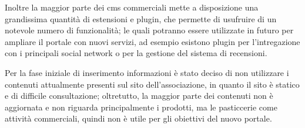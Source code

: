 Inoltre la maggior parte dei \gls{cms} commerciali mette a disposizione una grandissima quantità di estensioni e plugin, che permette di usufruire di un notevole numero di funzionalità; le quali potranno essere utilizzate in futuro per ampliare il portale con nuovi servizi, ad esempio esistono plugin per l'intregazione con i principali social network o per la gestione del sistema di recensioni.

Per la fase iniziale di inserimento informazioni è stato deciso di non utilizzare i contenuti attualmente presenti sul sito dell’associazione, in quanto il sito è statico e di difficile consultazione; oltretutto, la maggior parte dei contenuti non è aggiornata e non riguarda principalmente i prodotti, ma le pasticcerie come attività commerciali, quindi non è utile per gli obiettivi del nuovo portale.


%
%
%
%
%
%
